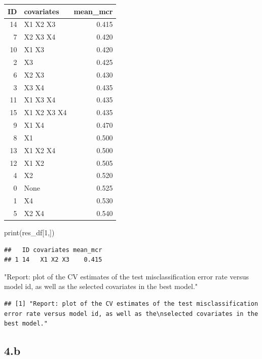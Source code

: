 \documentclass[
  11pt,
]{article}
\newenvironment{Shaded}{\begin{snugshade}}{\end{snugshade}}
\newcommand{\DecValTok}[1]{\textcolor[rgb]{0.00,0.00,0.81}{#1}}
\newcommand{\FunctionTok}[1]{\textcolor[rgb]{0.00,0.00,0.00}{#1}}
\newcommand{\NormalTok}[1]{#1}
\newcommand{\StringTok}[1]{\textcolor[rgb]{0.31,0.60,0.02}{#1}}
\begin{document}
\begin{longtable}[]{@{}rlr@{}}
\toprule()
ID & covariates & mean\_mcr \\
\midrule()
\endhead
14 & X1 X2 X3 & 0.415 \\
7 & X2 X3 X4 & 0.420 \\
10 & X1 X3 & 0.420 \\
2 & X3 & 0.425 \\
6 & X2 X3 & 0.430 \\
3 & X3 X4 & 0.435 \\
11 & X1 X3 X4 & 0.435 \\
15 & X1 X2 X3 X4 & 0.435 \\
9 & X1 X4 & 0.470 \\
8 & X1 & 0.500 \\
13 & X1 X2 X4 & 0.500 \\
12 & X1 X2 & 0.505 \\
4 & X2 & 0.520 \\
0 & None & 0.525 \\
1 & X4 & 0.530 \\
5 & X2 X4 & 0.540 \\
\bottomrule()
\end{longtable}

\begin{Shaded}
\begin{Highlighting}[]
\FunctionTok{print}\NormalTok{(res\_df[}\DecValTok{1}\NormalTok{,])}
\end{Highlighting}
\end{Shaded}

\begin{verbatim}
##   ID covariates mean_mcr
## 1 14   X1 X2 X3    0.415
\end{verbatim}

\begin{Shaded}
\begin{Highlighting}[]
\StringTok{"Report: plot of the CV estimates of the test misclassification error rate versus model id, as well as the}
\StringTok{selected covariates in the best model."}
\end{Highlighting}
\end{Shaded}

\begin{verbatim}
## [1] "Report: plot of the CV estimates of the test misclassification error rate versus model id, as well as the\nselected covariates in the best model."
\end{verbatim}

\hypertarget{b}{%
\subsection{4.b}\label{b}}
\end{document}
